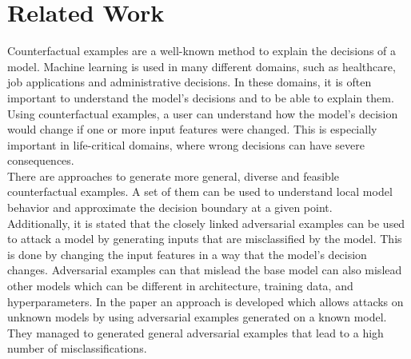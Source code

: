 \documentclass{article}
\begin{document}
\section{Related Work}
Counterfactual examples are a well-known method to explain the decisions of a model. Machine learning is used in many different domains, such as healthcare, job applications and administrative decisions. In these domains, it is often important to understand the model's decisions and to be able to explain them. Using counterfactual examples, a user can understand how the model's decision would change if one or more input features were changed. This is especially important in life-critical domains, where wrong decisions can have severe consequences. \cite{examples_cf_applications}\\
There are approaches to generate more general, diverse and feasible counterfactual examples. A set of them can be used to understand local model behavior and approximate the decision boundary at a given point.\cite{examples_cf_applications} \\
Additionally, it is stated that the closely linked adversarial examples can be used to attack a model by generating inputs that are misclassified by the model. This is done by changing the input features in a way that the model's decision changes. Adversarial examples can that mislead the base model can also mislead other models which can be different in architecture, training data, and hyperparameters. In the paper \cite{papernot2016transferabilitymachinelearningphenomena} an approach is developed which allows attacks on unknown models by using adversarial examples generated on a known model. They managed to generated general adversarial examples that lead to a high number of misclassifications. \cite{papernot2016transferabilitymachinelearningphenomena} \\
\end{document}
